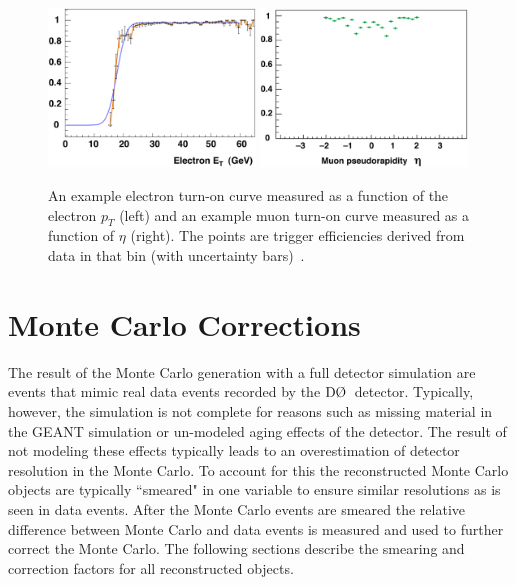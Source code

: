 \begin{figure}[!h!tbp]
\begin{center}
\includegraphics[width=0.49\textwidth]{eps/Reco/electron_turn-on_curve_pt.eps}
\includegraphics[width=0.49\textwidth]{eps/Reco/muon_turn-on_curve_eta.eps}
\end{center}
\vspace{-0.1in}
\caption{An example electron turn-on curve measured
as a function of the electron $p_{T}$ (left) and
an example muon turn-on curve measured as a function of $\eta$ (right). The points are trigger efficiencies derived from data
in that bin (with uncertainty bars)~\cite{singletopnote}.}
\label{triggereffexample}
\end{figure}


\section{Monte Carlo Corrections}
\label{corrections}

The result of the Monte Carlo generation with a full detector simulation are events that mimic real data events recorded by the $\dzero$~detector. Typically, however, the simulation is not complete for reasons such as missing material in the GEANT simulation or un-modeled aging effects of the detector. The result of not modeling these effects typically leads to an overestimation of detector resolution in the Monte Carlo. To account for this the reconstructed Monte Carlo objects are typically ``smeared" in one variable to ensure similar resolutions as is seen in data events. After the Monte Carlo events are smeared the relative difference between Monte Carlo and data events is measured and used to further correct the Monte Carlo. The following sections describe the smearing and correction factors for all reconstructed objects.


